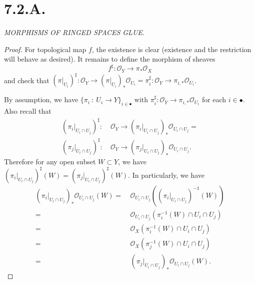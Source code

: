 \section{7.2.A.}\label{Rising Sea 7.2.A.}

\textit{MORPHISMS OF RINGED SPACES GLUE}.
\begin{proof}
    For topological map $f$, the existence is clear (existence and the restriction will behave as desired). It remains to define the morphism of sheaves $$f^{\sharp}:\mathscr O_Y\to \pi_{\ast}\mathscr O_X$$ and check that $(\pi\vert_{U_i})^{\sharp}:\mathscr O_Y\to (\pi\vert_{U_i})_{\ast}\mathscr O_{U_i}=\pi_i^{\sharp}:\mathscr O_Y\to \pi_{i,\ast}\mathscr O_{U_i}$.

    By assumption, we have $\{\pi_i~:~U_i\to Y\}_{i\in \bullet}$ with $\pi_i^{\sharp}:\mathscr O_Y\to \pi_{i,\ast}\mathscr O_{U_i}$ for each $i\in\bullet$. Also recall that 
    \begin{align*}
        (\pi_i\vert_{U_i\cap U_j})^{\sharp}:&~\mathscr O_Y\to (\pi_i\vert_{U_i\cap U_j})_{\ast}\mathscr O_{U_i\cap U_j}= \\
        (\pi_j\vert_{U_i\cap U_j})^{\sharp}:&~\mathscr O_Y\to (\pi_j\vert_{U_i\cap U_j})_{\ast}\mathscr O_{U_i\cap U_j}.
    \end{align*}Therefore for any open subset $W\subset Y$, we have $(\pi_i\vert_{U_i\cap U_j})^{\sharp}(W)=(\pi_j\vert_{U_i\cap U_j})^{\sharp}(W)$. In particularly, we have 
    \begin{align*}
        (\pi_i\vert_{U_i\cap U_j})_{\ast}\mathscr O_{U_i\cap U_j}(W) =&~ \mathscr O_{U_i\cap U_j}((\pi_i\vert_{U_i\cap U_j})^{-1}(W))\\
        =&~ \mathscr O_{U_i\cap U_j}(\pi_i^{-1}(W)\cap U_i\cap U_j)\\
        =&~ \mathscr O_{X}(\pi_i^{-1}(W)\cap U_i\cap U_j)\\
        =&~ \mathscr O_X(\pi_j^{-1}(W)\cap U_i\cap U_j)\\
        =&~ (\pi_j\vert_{U_i\cap U_j})_{\ast}\mathscr O_{U_i\cap U_j}(W). 
    \end{align*}


\end{proof}
